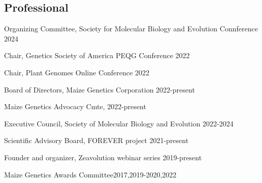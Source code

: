 \documentclass[letterpaper,10pt]{article}
\renewenvironment{itemize}{
  \begin{list}{}{
    \setlength{\leftmargin}{1.5em}
  }
}{
  \end{list}
}
\begin{document}
\begin{itemize}
\subsection*{Professional}
\item Organizing Committee, Society for Molecular Biology and Evolution Connference \hfill 2024
\item Chair, Genetics Society of America PEQG Conference  \hfill2022
\item Chair, Plant Genomes Online Conference \hfill 2022
\item Board of Directors, Maize Genetics Corporation \hfill2022-present
\item Maize Genetics Advocacy Cmte, \hfill 2022-present
\item Executive Council, Society of Molecular Biology and Evolution \hfill2022-2024
\item Scientific Advisory Board, FOREVER project \hfill2021-present %
\item Founder and organizer, Zeavolution webinar series \hfill2019-present
\item Maize Genetics Awards Committee\hfill2017,2019-2020,2022

\end{itemize}
\end{document}

